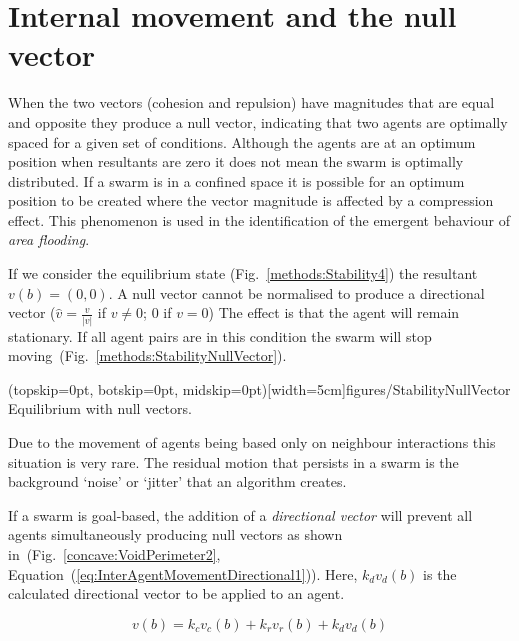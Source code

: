 \documentclass{ieeeaccess}
\begin{document}
\section{Internal movement and the null vector}\label{section:StabilityNullVector}
When the two vectors (cohesion and repulsion) have magnitudes that are equal and opposite they produce a null vector, indicating that two agents are optimally spaced for a given set of conditions. Although the agents are at an optimum position when resultants are zero it does not mean the swarm is optimally distributed. If a swarm is in a confined space it is possible for an optimum position to be created where the vector magnitude is affected by a compression effect. This phenomenon is used in the identification of the emergent behaviour of \emph{area flooding}.  

If we consider the equilibrium state (Fig.~\ref{methods:Stability4}) the resultant $v(b)=(0,0)$. A null vector cannot be normalised to produce a directional vector ($\hat{v} = \frac{v}{|v|}$ if $v\neq0$; $0$ if $v=0$) The effect is that the agent will remain stationary. If all agent pairs are in this condition the swarm will stop moving~(Fig.~\ref{methods:StabilityNullVector}).

\Figure[t!](topskip=0pt, botskip=0pt, midskip=0pt)[width=5cm]{figures/StabilityNullVector}
{Equilibrium with null vectors.\label{methods:StabilityNullVector}}


Due to the movement of agents being based only on neighbour interactions this situation is very rare. The residual motion that persists in a swarm is the background `noise' or `jitter' that an algorithm creates.

If a swarm is goal-based, the addition of a \emph{directional vector} will prevent all agents simultaneously producing null vectors as shown in~(Fig.~\ref{concave:VoidPerimeter2}, Equation~(\ref{eq:InterAgentMovementDirectional1})). Here, $k_dv_{d}(b)$ is the calculated directional vector to be applied to an agent.

\begin{equation}\label{eq:InterAgentMovementDirectional1}
v(b) = k_cv_{c}(b) + k_rv_{r}(b) + k_dv_{d}(b)
\end{equation}
\end{document}
